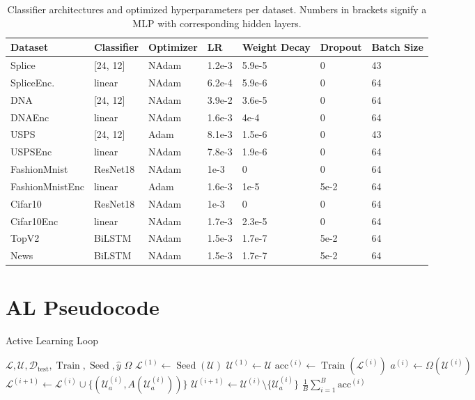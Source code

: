 \documentclass[]{article}
\newcommand{\D}{\mathcal{D}}
\newcommand{\U}{\mathcal{U}}
\newcommand{\LL}{\mathcal{L}}
\begin{document}
\begin{table}[H]
\centering
\begin{tabular}{l || l | l l l l l}
	Dataset & Classifier & Optimizer & LR & Weight Decay & Dropout & Batch Size \\
	\hline
	Splice & [24, 12] & NAdam & 1.2e-3 & 5.9e-5 & 0 & 43 \\
	SpliceEnc. & linear & NAdam & 6.2e-4 & 5.9e-6 & 0 & 64 \\
	DNA & [24, 12] & NAdam & 3.9e-2 & 3.6e-5 & 0 & 64 \\
	DNAEnc & linear & NAdam & 1.6e-3 & 4e-4 & 0 & 64 \\
	USPS & [24, 12] & Adam & 8.1e-3 & 1.5e-6 & 0 & 43 \\
	USPSEnc & linear & NAdam & 7.8e-3 & 1.9e-6 & 0 & 64 \\
	FashionMnist & ResNet18 & NAdam & 1e-3 & 0 & 0 & 64 \\
	FashionMnistEnc & linear & Adam & 1.6e-3 & 1e-5 & 5e-2 & 64 \\
	Cifar10 & ResNet18 & NAdam & 1e-3 & 0 & 0 & 64 \\
	Cifar10Enc & linear & NAdam & 1.7e-3 & 2.3e-5 & 0 & 64 \\
	TopV2 & BiLSTM & NAdam & 1.5e-3 & 1.7e-7 & 5e-2 & 64 \\
	News & BiLSTM & NAdam & 1.5e-3 & 1.7e-7 & 5e-2 & 64 \\
\end{tabular}
\caption{Classifier architectures and optimized hyperparameters per dataset. Numbers in brackets signify a MLP with corresponding hidden layers.}
\label{tab:architectures}
\end{table}

\section{AL Pseudocode}\label{app:pseudocode}
\begin{algorithm}[H]
	\caption{Active Learning Loop}\label{alg:active_learning}
	\begin{algorithmic}[1]
		\Require $\LL, \U, \D_\text{test}, \operatorname{Train}, \operatorname{Seed}, \hat y$
		\Require $\Omega$ 
		\State $\LL^{(1)} \gets \operatorname{Seed}(\U)$  
		\State $\U^{(1)} \gets \U$
		\State $\text{acc}^{(i)} \gets \operatorname{Train}(\LL^{(i)})$ 
		\State $a^{(i)} \gets \Omega(\mathcal{U}^{(i)})$ 
		\State $\mathcal{L}^{(i+1)} \gets \mathcal{L}^{(i)} \cup \{(\U^{(i)}_a, A(\U^{(i)}_{a}))\}$
		\State $\U^{(i+1)} \gets \U^{(i)} \setminus \{\U^{(i)}_a\}$
		\EndFor
		\State
		\Return $\frac{1}{B} \sum_{i=1}^{B} \text{acc}^{(i)}$
	\end{algorithmic}
\end{algorithm}
\end{document}
